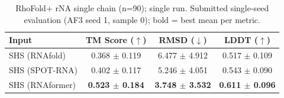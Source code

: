 \begin{table}[htbp]
\centering
\caption{RhoFold+ rNA single chain (n=90); single run. Submitted single-seed evaluation (AF3 seed 1, sample 0); bold = best mean per metric.}
\label{tab:rf_rna_single_chain}
\begin{tabular}{lccc}
\toprule
Input & TM Score ($\uparrow$) & RMSD ($\downarrow$) & LDDT ($\uparrow$) \\
\midrule
SHS (RNAfold) & 0.368 $\pm$ 0.119 & 6.477 $\pm$ 4.912 & 0.517 $\pm$ 0.109 \\
SHS (SPOT-RNA) & 0.402 $\pm$ 0.117 & 5.246 $\pm$ 4.051 & 0.543 $\pm$ 0.090 \\
SHS (RNAformer) & \textbf{0.523 $\pm$ 0.184} & \textbf{3.748 $\pm$ 3.532} & \textbf{0.611 $\pm$ 0.096} \\
\bottomrule
\end{tabular}
\end{table}

